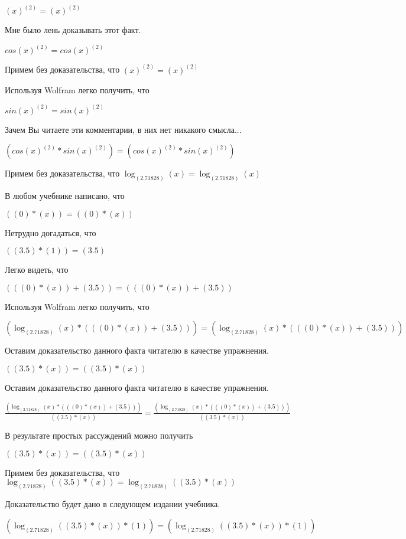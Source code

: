 \documentclass[12pt,a4paper,fleqn]{article}
\theoremstyle{definition}
\begin{document}
${( x )}^{( 2 )} = {( x )}^{( 2 )}$

Мне было лень доказывать этот факт.

$cos{( x )}^{( 2 )} = cos{( x )}^{( 2 )}$

Примем без доказательства, что
${( x )}^{( 2 )} = {( x )}^{( 2 )}$

Используя Wolfram легко получить, что

$sin{( x )}^{( 2 )} = sin{( x )}^{( 2 )}$

Зачем Вы читаете эти комментарии, в них нет никакого смысла...

$(cos{( x )}^{( 2 )} * sin{( x )}^{( 2 )}) = (cos{( x )}^{( 2 )} * sin{( x )}^{( 2 )})$

Примем без доказательства, что
$\log_{( 2.71828 )}{( x )} = \log_{( 2.71828 )}{( x )}$

В любом учебнике написано, что

$(( 0 ) * ( x )) = (( 0 ) * ( x ))$

Нетрудно догадаться, что

$(( 3.5 ) * ( 1 )) = ( 3.5 )$

Легко видеть, что

$((( 0 ) * ( x )) + ( 3.5 )) = ((( 0 ) * ( x )) + ( 3.5 ))$

Используя Wolfram легко получить, что

$(\log_{( 2.71828 )}{( x )} * ((( 0 ) * ( x )) + ( 3.5 ))) = (\log_{( 2.71828 )}{( x )} * ((( 0 ) * ( x )) + ( 3.5 )))$

Оставим доказательство данного факта читателю в качестве упражнения.

$(( 3.5 ) * ( x )) = (( 3.5 ) * ( x ))$

Оставим доказательство данного факта читателю в качестве упражнения.

$\frac{(\log_{( 2.71828 )}{( x )} * ((( 0 ) * ( x )) + ( 3.5 )))}{(( 3.5 ) * ( x ))}
 = \frac{(\log_{( 2.71828 )}{( x )} * ((( 0 ) * ( x )) + ( 3.5 )))}{(( 3.5 ) * ( x ))}
$

В результате простых рассуждений можно получить

$(( 3.5 ) * ( x )) = (( 3.5 ) * ( x ))$

Примем без доказательства, что
$\log_{( 2.71828 )}{(( 3.5 ) * ( x ))} = \log_{( 2.71828 )}{(( 3.5 ) * ( x ))}$

Доказательство будет дано в следующем издании учебника.

$(\log_{( 2.71828 )}{(( 3.5 ) * ( x ))} * ( 1 )) = (\log_{( 2.71828 )}{(( 3.5 ) * ( x ))} * ( 1 ))$
\end{document}
